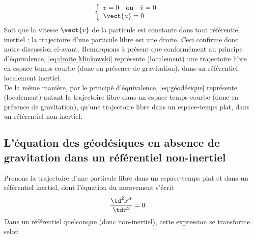 \begin{equation}
    \left\{
    \begin{array}{l}
        v = 0 \quad \text{ou} \quad \dot{v} = 0  \\
        \vect{a} = 0
    \end{array}
    \right.
\end{equation}
Soit que la vitesse $\vect{v}$ de la particule est constante dans tout référentiel inertiel : la trajectoire d'une particule libre est une droite. Ceci confirme donc notre discussion ci-avant. Remarquons à présent que conformément au principe d'équivalence, \ref{eq:droite Minkowski} représente (localement) une trajectoire libre en espace-temps courbe (donc en présence de gravitation), dans un référentiel localement inertiel. \\
De la même manière, par le principê d'équivalence, \ref{eq:géodésique} représente (localement) autant la trajectoire libre dans un espace-temps courbe (donc en présence de gravitation), qu'une trajectoire libre dans un espace-temps plat, dans un référentiel non-inertiel.
\subsection{L'équation des géodésiques en absence de gravitation dans un référentiel non-inertiel}
Prenons la trajectoire d'une particule libre dans un espace-temps plat et dans un référentiel inertiel, dont l'équation du mouvement s'écrit 
\begin{equation*}
    \frac{\td^2x^{\hat{\alpha}}}{\td\tau^2} = 0
\end{equation*}
Dans un référentiel quelconque (donc non-inertiel), cette expression se transforme selon

